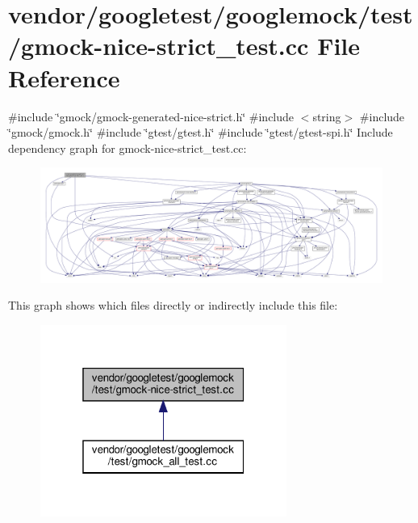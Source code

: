 \hypertarget{gmock-nice-strict__test_8cc}{}\section{vendor/googletest/googlemock/test/gmock-\/nice-\/strict\+\_\+test.cc File Reference}
\label{gmock-nice-strict__test_8cc}
{\ttfamily \#include \char`\"{}gmock/gmock-\/generated-\/nice-\/strict.\+h\char`\"{}}\newline
{\ttfamily \#include $<$string$>$}\newline
{\ttfamily \#include \char`\"{}gmock/gmock.\+h\char`\"{}}\newline
{\ttfamily \#include \char`\"{}gtest/gtest.\+h\char`\"{}}\newline
{\ttfamily \#include \char`\"{}gtest/gtest-\/spi.\+h\char`\"{}}\newline
Include dependency graph for gmock-\/nice-\/strict\+\_\+test.cc\+:
\nopagebreak
\begin{figure}[H]
\begin{center}
\leavevmode
\includegraphics[width=350pt]{gmock-nice-strict__test_8cc__incl}
\end{center}
\end{figure}
This graph shows which files directly or indirectly include this file\+:
\nopagebreak
\begin{figure}[H]
\begin{center}
\leavevmode
\includegraphics[width=229pt]{gmock-nice-strict__test_8cc__dep__incl}
\end{center}
\end{figure}
